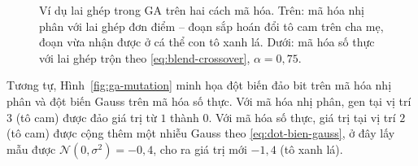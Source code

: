 \begin{figure}[H]
\caption{Ví dụ lai ghép trong GA trên hai cách mã hóa. Trên: mã hóa
nhị phân với lai ghép đơn điểm -- đoạn sắp hoán đổi tô cam trên cha
mẹ, đoạn vừa nhận được ở cá thể con tô xanh lá. Dưới: mã hóa số thực
với lai ghép trộn theo \eqref{eq:blend-crossover}, $\alpha = 0{,}75$.}
\label{fig:ga-crossover}
\end{figure}

Tương tự, Hình~\ref{fig:ga-mutation} minh họa đột biến đảo bit trên mã
hóa nhị phân và đột biến Gauss trên mã hóa số thực. Với mã hóa nhị
phân, gen tại vị trí $3$ (tô cam) được đảo giá trị từ $1$ thành $0$.
Với mã hóa số thực, giá trị tại vị trí $2$ (tô cam) được cộng thêm một
nhiễu Gauss theo \eqref{eq:dot-bien-gauss}, ở đây lấy mẫu được
$\mathcal{N}(0,\sigma^2) = -0{,}4$, cho ra giá trị mới $-1{,}4$ (tô
xanh lá).


